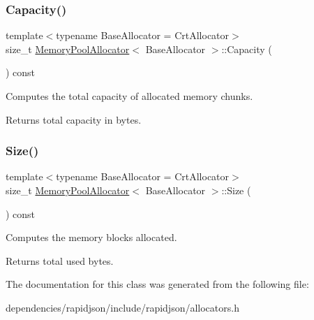 \subsubsection{\texorpdfstring{Capacity()}{Capacity()}}
{\footnotesize\ttfamily template$<$typename Base\+Allocator = Crt\+Allocator$>$ \\
size\+\_\+t \hyperlink{class_memory_pool_allocator}{Memory\+Pool\+Allocator}$<$ Base\+Allocator $>$\+::Capacity (\begin{DoxyParamCaption}{ }\end{DoxyParamCaption}) const\hspace{0.3cm}{\ttfamily [inline]}}



Computes the total capacity of allocated memory chunks. 

\begin{DoxyReturn}{Returns}
total capacity in bytes. 
\end{DoxyReturn}
\mbox{\label{class_memory_pool_allocator_ae7fcf0341c13e899cf488bc7c8949956}} 
\subsubsection{\texorpdfstring{Size()}{Size()}}
{\footnotesize\ttfamily template$<$typename Base\+Allocator = Crt\+Allocator$>$ \\
size\+\_\+t \hyperlink{class_memory_pool_allocator}{Memory\+Pool\+Allocator}$<$ Base\+Allocator $>$\+::Size (\begin{DoxyParamCaption}{ }\end{DoxyParamCaption}) const\hspace{0.3cm}{\ttfamily [inline]}}



Computes the memory blocks allocated. 

\begin{DoxyReturn}{Returns}
total used bytes. 
\end{DoxyReturn}


The documentation for this class was generated from the following file\+:\begin{DoxyCompactItemize}
\item 
dependencies/rapidjson/include/rapidjson/allocators.\+h\end{DoxyCompactItemize}
